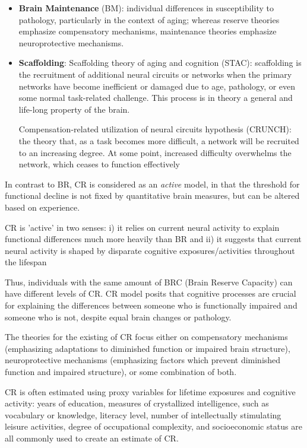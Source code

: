 \begin{mdframed}
\begin{itemize}
  \item {\bf Brain Maintenance} (BM): individual differences in susceptibility to pathology,
particularly in the context of aging; whereas reserve theories emphasize
compensatory mechanisms, maintenance theories emphasize neuroprotective mechanisms.
  
  \item {\bf Scaffolding}: Scaffolding theory of aging and cognition (STAC):
  scaffolding is the recruitment of additional neural circuits or networks when
  the primary networks have become inefficient or damaged due to age, pathology,
  or even some normal task-related challenge. This process is in theory a
  general and life-long property of the brain.

Compensation-related utilization of neural circuits hypothesis (CRUNCH): the
theory that, as a task becomes more difficult, a network will be recruited to an
increasing degree. At some point, increased difficulty overwhelms the network,
which ceases to function effectively


\end{itemize}
\end{mdframed}

In contrast to BR, CR is considered as an {\it active} model, in that the
threshold for functional decline is not fixed by quantitative brain measures,
but can be altered based on experience.

CR is 'active' in two senses: i) it relies on current neural activity to explain
functional differences much more heavily than BR and ii) it suggests that
current neural activity is shaped by disparate cognitive exposures/activities
throughout the lifespan

Thus, individuals with the same amount of BRC (Brain Reserve Capacity) can have
different levels of CR. CR model posits that cognitive processes are crucial for
explaining the differences between someone who is functionally impaired and
someone who is not, despite equal brain changes or pathology.

The theories for the existing of CR focus either on compensatory mechanisms
(emphasizing adaptations to diminished function or impaired brain structure),
neuroprotective mechanisms (emphasizing factors which prevent diminished
function and impaired structure), or some combination of both.


CR is often estimated using proxy variables for lifetime exposures and cognitive
activity: years of education, measures of crystallized intelligence, such as
vocabulary or knowledge, literacy level, number of intellectually stimulating
leisure activities, degree of occupational complexity, and socioeconomic status
are all commonly used to create an estimate of CR.

